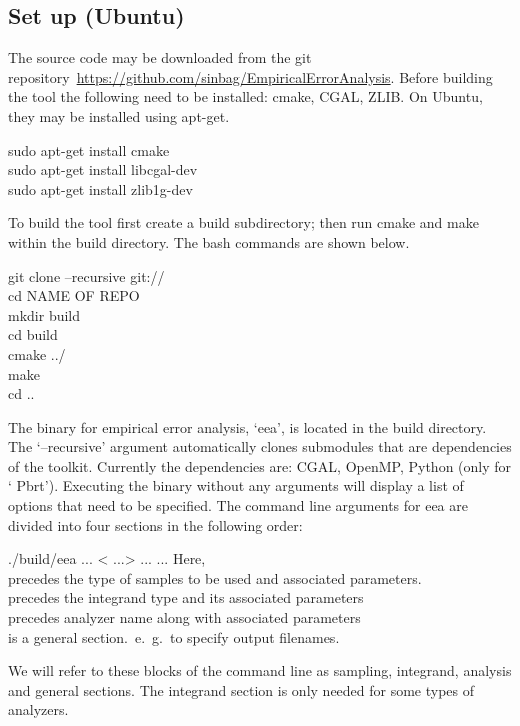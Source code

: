 \subsection{Set up (Ubuntu)}
The source code may be downloaded from the git repository~\url{https://github.com/sinbag/EmpiricalErrorAnalysis}. Before building the tool the following need
to be installed: cmake, CGAL, ZLIB. On Ubuntu, they may be installed using apt-get. 
\begin{tcolorbox}
 sudo apt-get install cmake \\
 sudo apt-get install libcgal-dev \\
 sudo apt-get install zlib1g-dev 
\end{tcolorbox}
 To build the tool first create a build subdirectory; then run cmake and make within the build directory. The bash commands are shown below. 
\begin{tcolorbox}
  git clone --recursive  git:// \\
  cd NAME OF REPO\\
  mkdir build\\
  cd build\\
  cmake ../ \\
  make\\
  cd ..
\end{tcolorbox}
The binary for empirical error analysis, `eea', is located in the build directory. The `--recursive' argument automatically clones submodules that are dependencies of the toolkit. Currently the dependencies are: CGAL, OpenMP, Python (only for  ` Pbrt'). Executing the binary without any arguments will display a list of options that need to be specified. The command line arguments for eea are divided into four sections in the following order:
\begin{tcolorbox}
 ./build/eea   ... < ...>  ...  ...
\tcblower
Here, \\
 precedes the type of samples to be used and associated parameters. \\
 precedes the integrand type and its associated parameters \\
 precedes analyzer name along with associated parameters \\
 is a general section.~e.~g.~to specify output filenames.
\end{tcolorbox}
 We will refer to these blocks of the command line as sampling, integrand, analysis and general sections. The integrand section is only needed for some types of analyzers.
 
